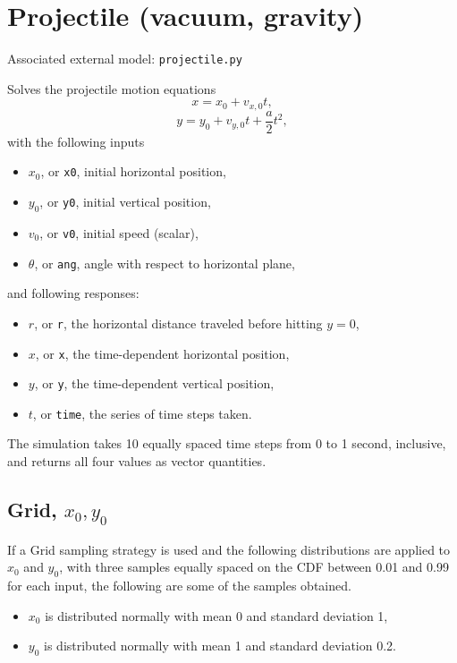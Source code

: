 \section{Projectile (vacuum, gravity)}
Associated external model: \texttt{projectile.py}

Solves the projectile motion equations
\begin{equation}
  x = x_0 + v_{x,0} t,
\end{equation}
\begin{equation}
  y = y_0 + v_{y,0} t + \frac{a}{2} t^2,
\end{equation}
with the following inputs
\begin{itemize}
  \item $x_0$, or \texttt{x0}, initial horizontal position,
  \item $y_0$, or \texttt{y0}, initial vertical position,
  \item $v_0$, or \texttt{v0}, initial speed (scalar),
  \item $\theta$, or \texttt{ang}, angle with respect to horizontal plane,
\end{itemize}
and following responses:
\begin{itemize}
  \item $r$, or \texttt{r}, the horizontal distance traveled before hitting $y=0$,
  \item $x$, or \texttt{x}, the time-dependent horizontal position,
  \item $y$, or \texttt{y}, the time-dependent vertical position,
  \item $t$, or \texttt{time}, the series of time steps taken.
\end{itemize}
The simulation takes 10 equally spaced time steps from 0 to 1 second, inclusive, and returns all four values
as vector quantities.

\subsection{Grid, $x_0,y_0$}
If a Grid sampling strategy is used and the following distributions are applied to $x_0$ and $y_0$, with three
samples equally spaced on the CDF between 0.01 and 0.99 for each input, the following are some of the samples obtained.
\begin{itemize}
  \item $x_0$ is distributed normally with mean 0 and standard deviation 1,
  \item $y_0$ is distributed normally with mean 1 and standard deviation 0.2.
\end{itemize}

